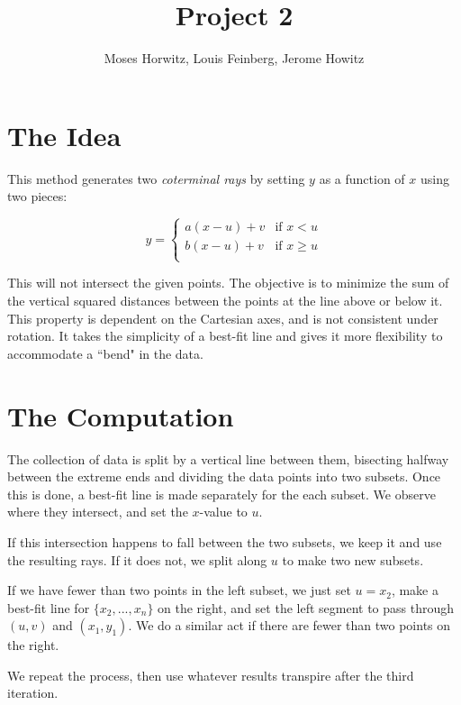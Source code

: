 \documentclass[11pt]{article}
\begin{document}
\title{Project 2}
\date{}
\author{Moses Horwitz, Louis Feinberg, Jerome Howitz}

\maketitle 

\section*{The Idea}

This method generates two \emph{coterminal rays} by setting \(y\) as a function of \(x\) using two pieces:

$$
y = 
\left\{
\begin{array}{ll}
a (x - u) + v & \text{if } x < u \\
b (x - u) + v & \text{if } x \ge u \\
\end{array}
\right.
$$

This will not intersect the given points. The objective is to minimize the sum of the vertical squared distances between the points at the line above or below it. This property is dependent on the Cartesian axes, and is not consistent under rotation. It takes the simplicity of a best-fit line and gives it more flexibility to accommodate a ``bend" in the data.

\section*{The Computation}

The collection of data is split by a vertical line between them, bisecting halfway between the extreme ends and dividing the data points into two subsets. Once this is done, a best-fit line is made separately for the each subset. We observe where they intersect, and set the \(x\)-value to \(u\). 


If this intersection happens to fall between the two subsets, we keep it and use the resulting rays. If it does not, we split along \(u\) to make two new subsets.

If we have fewer than two points in the left subset, we just set \(u = x_2\), make a best-fit line for \(\{x_2, ..., x_n\}\) on the right, and set the left segment to pass through \((u,v)\) and \((x_1, y_1)\). We do a similar act if there are fewer than two points on the right. 


We repeat the process, then use whatever results transpire after the third iteration.
\end{document}
